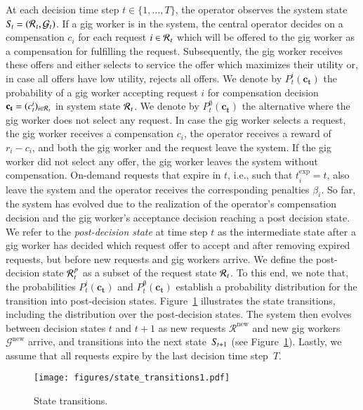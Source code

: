At each decision time step $t \in \{1,...,T\}$, the operator observes the system state $S\hspace{-0.1em}_t = (\mathcal{R}\hspace{0.05em}_{t},\mathcal{G}_t)$. If a gig worker is in the system, the central operator decides on a compensation $c_i$ for each request $i \in \mathcal{R}\hspace{0.05em}_{t}$ which will be offered to the gig worker as a compensation for fulfilling the request. Subsequently, the gig worker receives these offers and either selects to service the offer which maximizes their utility or, in case all offers have low utility, rejects all offers. We denote by $P^i_{t}(\mathbf{c_t})$ the probability of a gig worker accepting request $i$ for compensation decision $\mathbf{c_t} = (c^i_t)_{i \in \mathcal{R}\hspace{0.05em}_{t}}$ in system state $\mathcal{R}\hspace{0.05em}_{t}$. We denote by $P^\emptyset_{t}(\mathbf{c_t})$ the alternative where the gig worker does not select any request. In case the gig worker selects a request, the gig worker receives a compensation $c_i$, the operator receives a reward of $r_i - c_i$, and both the gig worker and the request leave the system. If the gig worker did not select any offer, the gig worker leaves the system without compensation. On-demand requests that expire in $t$, i.e., such that $t_i^{\mathrm{exp}} = t$, also leave the system and the operator receives the corresponding penalties $\beta_i$. So far, the system has evolved due to the realization of the operator's compensation decision and the gig worker's acceptance decision reaching a post decision state. We refer to the \textit{post-decision state} at time step $t$ as the intermediate state after a gig worker has decided which request offer to accept and after removing expired requests, but before new requests and gig workers arrive. We define the post-decision state $\mathcal{R}\hspace{0.05em}_t^{p}$ as a subset of the request state $\mathcal{R}\hspace{0.05em}_{t}$. To this end, we note that, the probabilities $P^i_{t}(\mathbf{c_t})$ and $P^\emptyset_{t}(\mathbf{c_t})$ establish a probability distribution for the transition into post-decision states. Figure~\ref{fig:state_trans} illustrates the state transitions, including the distribution over the post-decision states. The system then evolves between decision states $t$ and $t+1$ as new requests $\mathcal{R}^{\mathrm{new}}$ and new gig workers $\mathcal{G}^{\mathrm{new}}$ arrive, and transitions into the next state~$S\hspace{-0.1em}_{t+1}$ (see Figure~\ref{fig:state_trans}). Lastly, we assume that all requests expire by the last decision time step~$T$.
\begin{figure}[t!]%
    \centering
    \fontsize{10}{10}\selectfont
    \texttt{[image: figures/state\_transitions1.pdf]}
    \caption{\textnormal{State transitions.}}
    \label{fig:state_trans}%
\end{figure} 

